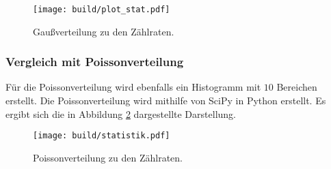 \begin{figure}
  \centering
  \texttt{[image: build/plot\_stat.pdf]}
  \caption{Gaußverteilung zu den Zählraten.}
  \label{abb:6}
\end{figure}

\subsubsection{Vergleich mit Poissonverteilung}
Für die Poissonverteilung wird ebenfalls ein Histogramm mit $\num{10}$ Bereichen erstellt.
Die Poissonverteilung wird mithilfe von SciPy in Python erstellt.
Es ergibt sich die in Abbildung \ref{abb:7} dargestellte Darstellung.

\begin{figure}
  \centering
  \texttt{[image: build/statistik.pdf]}
  \caption{Poissonverteilung zu den Zählraten.}
  \label{abb:7}
\end{figure}
